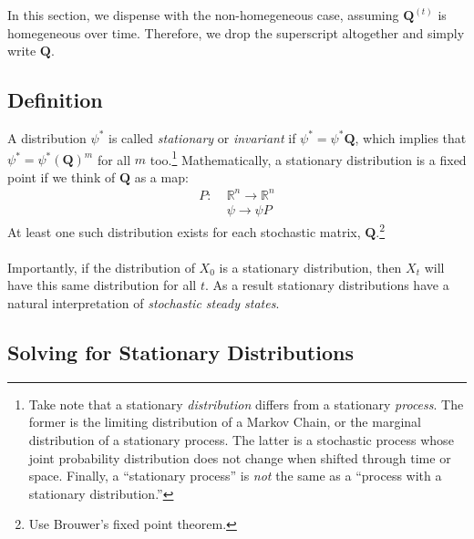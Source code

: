 \documentclass[12pt]{article}
\theoremstyle{plain}
\theoremstyle{definition}
\theoremstyle{remark}
\begin{document}
In this section, we dispense with the non-homegeneous
case, assuming $\mathbf{Q}^{(t)}$ is homegeneous
over time. Therefore, we drop the superscript altogether
and simply write $\mathbf{Q}$.

\subsection{Definition}

A distribution $\psi^*$ is called {\sl stationary} or 
{\sl invariant} if $\psi^* = \psi^* \mathbf{Q}$,
which implies that $\psi^* = \psi^* \left(\mathbf{Q}\right)^m$
for all $m$ too.\footnote{Take note that a stationary 
    \emph{distribution} differs from a stationary \emph{process}.
    The former is the limiting distribution of a Markov Chain,
    or the marginal distribution of a stationary process. The
    latter is a stochastic process whose joint probability 
    distribution does not change when shifted through time or
    space.  Finally, a ``stationary process'' is \emph{not} the
    same as a ``process with a stationary distribution.''}
Mathematically, a stationary distribution
is a fixed point if we think of $\mathbf{Q}$ as a map:
\begin{align*}
    P: \; &\mathbb{R}^n \rightarrow \mathbb{R}^n \\
    &\psi \rightarrow \psi P
\end{align*}
At least one such distribution exists for each stochastic
matrix, $\mathbf{Q}$.\footnote{Use Brouwer's fixed point theorem.}
\\
\\
Importantly, if the distribution of $X_0$ is a stationary distribution,
then $X_t$ will have this same distribution for all $t$.
As a result stationary distributions have a natural
interpretation of \emph{stochastic steady states}.


\subsection{Solving for Stationary Distributions}
\end{document}
